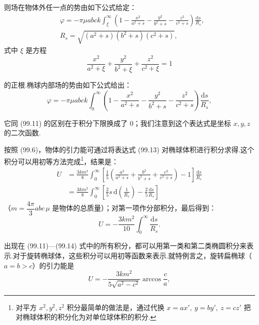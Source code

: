 则场在物体外任一点的势由如下公式给定：
\begin{equation}
\begin{aligned}
  &\varphi=-\pi\mu abck\int_{\xi}^{\infty}
  \left(1-\frac{x^{2}}{a^{2}+s}-\frac{y^{2}}{b^{2}+s}
  -\frac{z^{2}}{c^{2}+s}\right)\frac{\mathrm{d}s}{R_s},\\
  &R_s=\sqrt{(a^{2}+s)(b^{2}+s)(c^{2}+s)},
\end{aligned}
\end{equation}
式中 $\xi$ 是方程
\begin{equation}
  \frac{x^{2}}{a^{2}+\xi}+\frac{y^{2}}{b^{2}+\xi}
  +\frac{z^{2}}{c^{2}+\xi}=1
\end{equation}

的正根.椭球内部场的势由如下公式给出：
\begin{equation}
  \varphi=-\pi\mu abck\int_{0}^{\infty}
  \left(1-\frac{x^{2}}{a^{2}+s}-\frac{y^{2}}{b^{2}+s}
  -\frac{z^{2}}{c^{2}+s}\right)\frac{\mathrm{d}s}{R_s},
\end{equation}

它同 (99.11) 的区别在于积分下限换成了 0；我们注意到这个表达式是坐标 $x,y,z$ 的二次函数.

按照 (99.6)，物体的引力能可通过将表达式 (99.13) 对椭球体积进行积分求得.这个积分可以用初等方法完成\footnote{对平方 $x^{2},y^{2},z^{2}$ 积分最简单的做法是，通过代换 $x=ax',\ y=by',\ z=cz'$ 把对椭球体积的积分化为对单位球体积的积分.}，结果是：
\begin{equation*}
\begin{aligned}
  U&=\frac{3km^{2}}{8}\int_{0}^{\infty}
  \left[\frac{1}{5}\left(\frac{a^{2}}{a^{2}+s}
  +\frac{b^{2}}{b^{2}+s}+\frac{c^{2}}{c^{2}+s}\right)-1\right]
  \frac{\mathrm{d}s}{R_s}\\
  &=\frac{3km^{2}}{8}\int_{0}^{\infty}
  \left[\frac{2}{5}s\,\mathrm{d}\left(\frac{1}{R_s}\right)
  -\frac{2}{5}\frac{\mathrm{d}s}{R_s}\right]
\end{aligned}
\end{equation*}
（$m=\dfrac{4\pi}{3}abc\,\mu$ 是物体的总质量）；对第一项作分部积分，最后得到：
\begin{equation}
  U=-\frac{3km^{2}}{10}\int_{0}^{\infty}\frac{\mathrm{d}s}{R_s}.
\end{equation}

出现在 (99.11)—(99.14) 式中的所有积分，都可以用第一类和第二类椭圆积分来表示.对于旋转椭球体，这些积分可以用初等函数来表示.就特例言之，旋转扁椭球（$a=b>c$）的引力能是
\begin{equation}
  U=-\frac{3km^{2}}{5\sqrt{a^{2}-c^{2}}}
  \arccos\frac{c}{a},
\end{equation}

